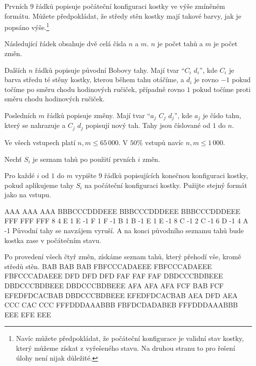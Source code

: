 
Prvních $9$ řádků popisuje počáteční konfiguraci kostky
ve výše zmíněném formátu. Můžete předpokládat, že středy
stěn kostky mají takové barvy, jak je popsáno
výše.\footnote{Navíc můžete předpokládat, že počáteční konfigurace
je validní stav kostky, který můžeme získat z vyřešeného stavu.
Na druhou stranu to pro řešení úlohy není nijak důležité.}

Následující řádek obsahuje dvě celá čísla $n$ a $m$.
$n$ je počet tahů a $m$ je počet změn.

Dalších $n$ řádků popisuje původní Bobovy tahy.
Mají tvar ``$C_i$ $d_i$'',
kde $C_i$ je barva středu té stěny kostky,
kterou během tahu otáčíme, a $d_i$ je rovno $-1$
pokud točíme po směru chodu hodinových ručiček, případně
rovno $1$ pokud točíme proti směru chodu hodinových ručiček.

Posledních $m$ řádků popisuje změny.
Mají tvar ``$a_j$ $C_j$ $d_j$'',
kde $a_j$ je číslo tahu, který se nahrazuje
a $C_j$ $d_j$ popisují nový tah.
Tahy jsou číslované od $1$ do $n$.


Ve všech vstupech platí $n, m \leq 65\,000$.
V $50\%$ vstupů navíc $n, m \leq 1\,000$.

\pagebreak


Nechť $S_i$ je seznam tahů po použití prvních $i$ změn.

Pro každé $i$ od $1$ do $m$ vypište $9$ řádků popisujících konečnou konfiguraci kostky, pokud aplikujeme tahy $S_i$ na počáteční konfiguraci kostky. Pužijte stejný formát jako na vstupu.


\sampleIN
AAA
AAA
AAA
BBBCCCDDDEEE
BBBCCCDDDEEE
BBBCCCDDDEEE
FFF
FFF
FFF
8 4
E 1
E -1
F 1
F -1
B 1
B -1
E 1
E -1
8 C -1
2 C -1
6 D -1
4 A -1
\sampleCOMMENT
Původní tahy se navzájem vyruší. A na konci původního seznamu tahů
bude kostka zase v počátečním stavu.

Po provedení všech čtyř změn, získáme seznam tahů, který
přehodí vše, kromě středů stěn.
\sampleOUT
BAB
BAB
BAB
FBFCCCADAEEE
FBFCCCADAEEE
FBFCCCADAEEE
DFD
DFD
DFD
FAF
FAF
FAF
DBDCCCBDBEEE
DBDCCCBDBEEE
DBDCCCBDBEEE
AFA
AFA
AFA
FCF
BAB
FCF
EFEDFDCACBAB
DBDCCCBDBEEE
EFEDFDCACBAB
AEA
DFD
AEA
CCC
CAC
CCC
FFFDDDAAABBB
FBFDCDADABEB
FFFDDDAAABBB
EEE
EFE
EEE
\sampleEND




